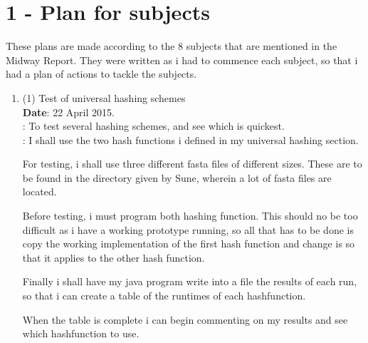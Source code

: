\documentclass[../../main.tex]{subfiles}
\begin{document}
\section*{1 - Plan for subjects}
These plans are made according to the 8 subjects that are mentioned in the Midway Report. They were written as i had to commence each subject, so that i had a plan of actions to tackle the subjects.
\begin{enumerate}
\item (1) Test of universal hashing schemes\\
{\bf Date}: 22 April 2015.\\
: To test several hashing schemes, and see which is quickest.\\
: I shall use the two hash functions i defined in my universal hashing section.

For testing, i shall use three different fasta files of different sizes. These are to be found in the directory given by Sune, wherein a lot of fasta files are located. 

Before testing, i must program both hashing function. This should no be too difficult as i have a working prototype running, so all that has to be done is copy the working implementation of the first hash function and change is so that it applies to the other hash function. 

Finally i shall have my java program write into a file the results of each run, so that i can create a table of the runtimes of each hashfunction. 

When the table is complete i can begin commenting on my results and see which hashfunction to use.
\end{enumerate}
\end{document}
